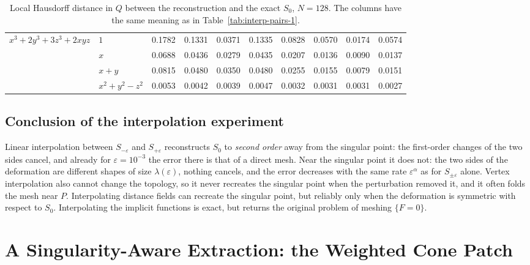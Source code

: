 \documentclass[12pt, a4paper]{article}
\theoremstyle{plain}
\theoremstyle{definition}
\theoremstyle{remark}
\theoremstyle{definition}
\begin{document}
\begin{table}[!ht]
\begin{adjustbox}{max width=\textwidth}
\begin{tabular}{l l c c c c c c c c}
\midrule
$x^3+2y^3+3z^3+2xyz$ & $1$ & 0.1782 & 0.1331 & 0.0371 & 0.1335 & 0.0828 & 0.0570 & 0.0174 & 0.0574 \\
 & $x$ & 0.0688 & 0.0436 & 0.0279 & 0.0435 & 0.0207 & 0.0136 & 0.0090 & 0.0137 \\
 & $x+y$ & 0.0815 & 0.0480 & 0.0350 & 0.0480 & 0.0255 & 0.0155 & 0.0079 & 0.0151 \\
 & $x^2+y^2-z^2$ & 0.0053 & 0.0042 & 0.0039 & 0.0047 & 0.0032 & 0.0031 & 0.0031 & 0.0027 \\
\bottomrule
\end{tabular}
\end{adjustbox}
\caption[Interpolation: all pairs (2/2)]{Local Hausdorff distance in $Q$ between the reconstruction and the exact $S_0$, $N=128$. The columns have the same meaning as in Table~\ref{tab:interp-pairs-1}.}
\label{tab:interp-pairs-2}
\end{table}

\subsection{Conclusion of the interpolation experiment}

Linear interpolation between $S_{-\varepsilon}$ and $S_{+\varepsilon}$ reconstructs
$S_0$ to \emph{second order} away from the singular point: the first-order changes
of the two sides cancel, and already for $\varepsilon=10^{-3}$ the error there is
that of a direct mesh. Near the singular point it does not: the two sides of the
deformation are different shapes of size $\lambda(\varepsilon)$, nothing cancels,
and the error decreases with the same rate $\varepsilon^\alpha$ as for
$S_{\pm\varepsilon}$ alone. Vertex interpolation also cannot change the topology,
so it never recreates the singular point when the perturbation removed it, and it
often folds the mesh near $P$. Interpolating distance fields can recreate the
singular point, but reliably only when the deformation is symmetric with respect to
$S_0$. Interpolating the implicit functions is exact, but returns the original
problem of meshing $\{F=0\}$.

\section{A Singularity-Aware Extraction: the Weighted Cone Patch}
\label{sec:r-cone}
\end{document}
